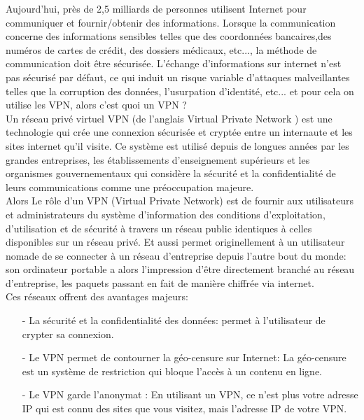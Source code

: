 \documentclass[12pt,a4paper]{article}
\begin{document}
    Aujourd’hui, près de 2,5 milliards de personnes utilisent Internet pour communiquer et fournir/obtenir des informations.
Lorsque la communication concerne des informations sensibles telles que des coordonnées bancaires,des numéros de cartes de crédit, des dossiers médicaux, etc..., la méthode de communication doit être sécurisée.
L’échange d’informations sur internet n’est pas sécurisé par défaut, ce qui induit un risque variable d’attaques malveillantes telles que la corruption des données, l’usurpation d’identité, etc... et pour cela on utilise les VPN, alors c'est quoi un VPN ? \\

    Un réseau privé virtuel VPN (de l'anglais Virtual Private Network ) est une technologie qui crée une connexion sécurisée et cryptée entre un internaute et les sites internet qu'il visite. Ce système est utilisé depuis de longues années par les grandes entreprises, les établissements d'enseignement supérieurs et les organismes gouvernementaux qui considère la sécurité et la confidentialité de leurs communications comme une préoccupation majeure.
\\

     Alors Le rôle d'un VPN (Virtual Private Network) est de fournir aux utilisateurs et administrateurs du système d'information des conditions d'exploitation, d'utilisation et de sécurité à travers un réseau public identiques à celles disponibles sur un réseau privé. Et aussi permet originellement à un utilisateur nomade de se connecter à un réseau d'entreprise depuis l'autre bout du monde: son ordinateur portable a alors l'impression d'être directement branché au réseau d'entreprise, les paquets passant en fait de manière chiffrée via internet.\\
	
Ces réseaux offrent des avantages majeurs: \\

\begin{itemize}
\item[-] La sécurité et la confidentialité des données: permet à l'utilisateur de crypter sa connexion.\\
\item[-] Le VPN permet de contourner la géo-censure sur Internet: La géo-censure est un système de restriction qui bloque l’accès à un contenu en ligne.\\
\item[-] Le VPN garde l'anonymat : En utilisant un VPN, ce n’est plus votre adresse IP qui est connu des sites que vous visitez, mais l’adresse IP de votre VPN. \\
\end{itemize}
\end{document}
